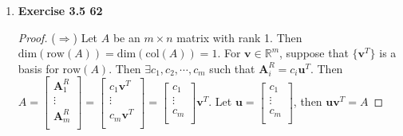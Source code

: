 \begin{enumerate}
\begin{proof}
		\noindent \textbf{(b)}
		By Exercise 3.5 60, $ \text{rank}(A) = \text{rank}\left(\left(AV\right)\inv{V}\right) \leq \text{rank}(AV) \leq \text{rank}(A) $. $ \therefore \text{rank}(AV) = \text{rank}(A) $.
	\end{proof}
	\item \textbf{Exercise 3.5 62}
	\begin{proof}
		\noindent ($\Rightarrow$)
		Let $ A $ be an $ m\times n $ matrix with rank 1. Then $ \text{dim}\left(\text{row}(A)\right) = \text{dim}\left(\text{col}(A)\right) = 1$. 
		For $ \textbf{v} \in \mathbb{R}^m$, suppose that $ \{\textbf{v}^T\} $ is a basis for $ \text{row}(A) $. Then $ \exists c_{1}, c_{2}, \cdots , c_{m} $ such that $ \textbf{A}^R_i = c_{i}\textbf{u}^T $. 
		Then $ A = \begin{bmatrix}
		\textbf{A}^R_1 \\
		\vdots \\
		\textbf{A}^R_m \\
		\end{bmatrix} = \begin{bmatrix}
		c_{1}\textbf{v}^T \\
		\vdots \\
		c_{m}\textbf{v}^T \\
		\end{bmatrix} = \begin{bmatrix}
		c_{1} \\
		\vdots \\
		c_{m} \\
		\end{bmatrix}\textbf{v}^T$. Let $ \textbf{u}=\begin{bmatrix}
		c_{1} \\
		\vdots \\
		c_{m} \\
		\end{bmatrix} $, then $ \textbf{u}\textbf{v}^T = A $
		

\end{proof}
\end{enumerate}
